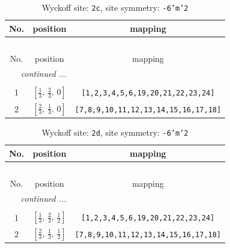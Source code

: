\documentclass[fleqn,8pt]{jsarticle}
\begin{document}
\begin{longtable}{ccc}
\caption{Wyckoff site: {\tt 2c}, site symmetry: {\tt -6'm'2}}
 \\
 \hline \hline
No. & position & mapping \\ \hline \endfirsthead

\multicolumn{2}{l}{\tablename\ \thetable{}} \\
 \hline \hline
No. & position & mapping \\ \hline \endhead

 \hline \hline
\multicolumn{2}{r}{\footnotesize\it continued ...} \\ \endfoot

 \hline \hline
\multicolumn{2}{r}{} \\ \endlastfoot

1 & $\left[ \frac{1}{3},\, \frac{2}{3},\, 0 \right]$ & {\tt [1,2,3,4,5,6,19,20,21,22,23,24]} \\ \hline
2 & $\left[ \frac{2}{3},\, \frac{1}{3},\, 0 \right]$ & {\tt [7,8,9,10,11,12,13,14,15,16,17,18]} \\
\end{longtable}
\renewcommand{\arraystretch}{1.2}
\begin{longtable}{ccc}
\caption{Wyckoff site: {\tt 2d}, site symmetry: {\tt -6'm'2}}
 \\
 \hline \hline
No. & position & mapping \\ \hline \endfirsthead

\multicolumn{2}{l}{\tablename\ \thetable{}} \\
 \hline \hline
No. & position & mapping \\ \hline \endhead

 \hline \hline
\multicolumn{2}{r}{\footnotesize\it continued ...} \\ \endfoot

 \hline \hline
\multicolumn{2}{r}{} \\ \endlastfoot

1 & $\left[ \frac{1}{3},\, \frac{2}{3},\, \frac{1}{2} \right]$ & {\tt [1,2,3,4,5,6,19,20,21,22,23,24]} \\ \hline
2 & $\left[ \frac{2}{3},\, \frac{1}{3},\, \frac{1}{2} \right]$ & {\tt [7,8,9,10,11,12,13,14,15,16,17,18]} \\
\end{longtable}
\renewcommand{\arraystretch}{1.2}
\end{document}
